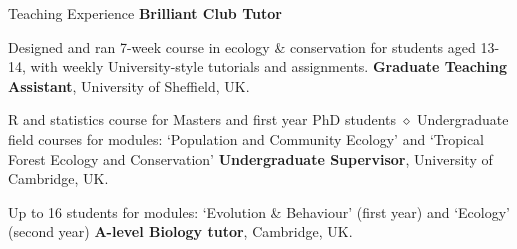 \begin{rubric}{Teaching Experience}
\entry*[2017 -- 2018] \textbf{Brilliant Club Tutor}
\par Designed and ran 7-week course in ecology \& conservation for students aged 13-14, with weekly University-style tutorials and assignments.
\entry*[2014 -- 2018] \textbf{Graduate Teaching Assistant}, University of Sheffield, UK.
\par R and statistics course for Masters and first year PhD students $\diamond$ Undergraduate field courses for modules: `Population and Community Ecology' and `Tropical Forest Ecology and Conservation'
%
\entry*[2013 -- 2014] \textbf{Undergraduate Supervisor}, University of Cambridge, UK.
\par Up to 16 students for modules: `Evolution \& Behaviour' (first year) and  `Ecology' (second year)
\entry*[2013 -- 2014] \textbf{A-level Biology tutor}, Cambridge, UK.

\end{rubric}
